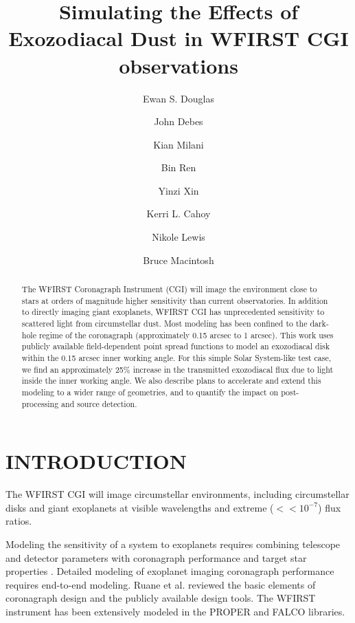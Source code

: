 \documentclass[]{spie}  %
\title{Simulating the Effects of Exozodiacal Dust in WFIRST CGI observations}
\author[a]{Ewan S. Douglas}
\author[b]{John Debes}
\author[a]{Kian Milani}
\author[b]{Bin Ren}
\author[c]{Yinzi Xin}
\author[c]{Kerri L. Cahoy}
\author[d]{Nikole Lewis}
\author[e]{Bruce Macintosh}
\affil[a]{University of Arizona, Tucson, AZ, USA}
\affil[b]{STScI, Baltimore, MD, USA}
\affil[c]{MIT, Cambridge, MA, USA}
\affil[d]{Cornell University, Ithaca, NY , USA}
\affil[e]{Stanford University, Palo Alto, CA, USA}
\begin{document}
 
\maketitle

\begin{abstract}
The WFIRST Coronagraph Instrument (CGI) will image the environment close to stars at orders of magnitude higher sensitivity than current observatories. In addition to directly imaging giant exoplanets,  WFIRST CGI has unprecedented sensitivity to scattered light from circumstellar dust.
Most modeling has been confined to the dark-hole regime of the coronagraph (approximately 0.15 arcsec to  1 arcsec).
This work uses publicly available field-dependent point spread functions to model an exozodiacal disk within the 0.15 arcsec inner working angle. For this simple Solar System-like test case, we find an approximately 25\% increase in the transmitted exozodiacal flux due to light inside the inner working angle. We also describe plans to accelerate and extend this modeling to a wider range of geometries, and to quantify the impact on post-processing and source detection. 

\end{abstract}


\section{INTRODUCTION}\label{sec:intro}  %

The \gls{WFIRST} \gls{CGI}\cite{spergel_wide-field_2015,noecker_coronagraph_2016} will image circumstellar environments, including circumstellar disks\cite{schneider_quick_2014,schneider_detection_2016} and giant exoplanets  \cite{marley_quick_2014,ygouf_data_2016-1,bailey_lessons_2018} at visible wavelengths and extreme ($<<10^{-7}$) flux ratios\cite{douglas_wfirst_2018,kasdin_wfirst_2018}.

Modeling the sensitivity of a system to exoplanets requires combining telescope and detector parameters with coronagraph performance and target star properties \cite{nemati_sensitivity_2017,savransky_exosims_2018}.
Detailed modeling of exoplanet imaging coronagraph performance requires end-to-end  modeling. 
Ruane et al.\cite{ruane_review_2018} reviewed the basic elements of coronagraph design and the publicly available design tools.
The \gls{WFIRST} instrument has been extensively modeled in the PROPER\cite{krist_overview_2015,krist_wfirst_2017,krist_wfirst_2018,zhou_high_2018} and FALCO\cite{riggs_fast_2018,sidick_fast_2018} libraries.
\end{document}
